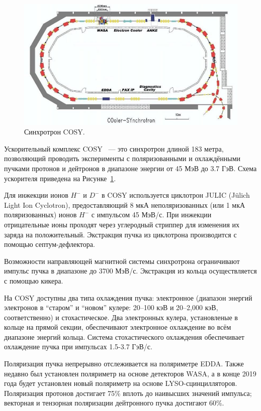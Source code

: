 
\begin{figure}[h]
	\centering
	\includegraphics[scale=.5]{images/chapter4/800px-COSY_Ring}
	\caption{Синхротрон COSY.\label{fig:COSY_Ring}}
\end{figure}

Ускорительный комплекс COSY~\cite{COSY-Ring} --- это синхротрон длиной 183 метра, позволяющий проводить эксперименты с поляризованными и охлаждёнными пучками протонов и дейтронов в диапазоне энергии от 45 МэВ до 3.7 ГэВ. Схема ускорителя приведена на Рисунке~\ref{fig:COSY_Ring}.

Для инжекции ионов $H^-$ и $D^-$ в COSY  используется циклотрон JULIC (J\"ulich Light Ion Cyclotron), предоставляющий 8 мкА неполяризованных (или 1 мкА поляризованных) ионов $H^-$ с импульсом 45 МэВ/с. При инжекции отрицательные ионы проходят через углеродный стриппер для изменения их заряда на положительный. Экстракция пучка из циклотрона производится с помощью септум-дефлектора.~\cite{JULIC-Injector}

Возможности направляющей магнитной системы синхротрона ограничивают импульс пучка в диапазоне до 3700 МэВ/с. Экстракция из кольца осуществляется с помощью кикера.

На COSY доступны два типа охлаждения пучка: электронное (диапазон энергий электронов в ``старом'' и ``новом'' кулере: 20--100 кэВ и 20--2,000 кэВ, соответственно) и стохастическое. 
%
Два электронных кулера, установленые в кольце на прямой секции, обеспечивают электронное охлаждение во всём диапазоне энергий кольца. Система стохастического охлаждения обеспечивает охлаждение пучка при импульсах 1.5-3.7 ГэВ/с.

Поляризация пучка непрерывно отслеживается на поляриметре  EDDA. Также недавно был установлен поляриметр на основе детекторов WASA, а в конце 2019 года будет установлен новый поляриметр на основе LYSO-сцинцилляторов.
Поляризация протонов достигает 75\% вплоть до наивысших значений импульса; векторная и тензорная поляризации дейтронного пучка достигают 60\%.